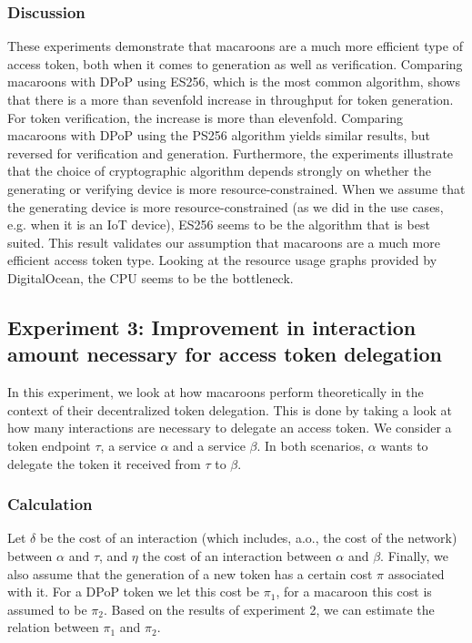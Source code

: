 \subsubsection{Discussion}
These experiments demonstrate that macaroons are a much more efficient type of access token, both when it comes to generation as well as verification. Comparing macaroons with \gls{DPoP} using ES256, which is the most common algorithm, shows that there is a more than sevenfold increase in throughput for token generation. For token verification, the increase is more than elevenfold. Comparing macaroons with \gls{DPoP} using the PS256 algorithm yields similar results, but reversed for verification and generation. Furthermore, the experiments illustrate that the choice of cryptographic algorithm depends strongly on whether the generating or verifying device is more resource-constrained. When we assume that the generating device is more resource-constrained (as we did in the use cases, e.g. when it is an IoT device), ES256 seems to be the algorithm that is best suited.  This result validates our assumption that macaroons are a much more efficient access token type. Looking at the resource usage graphs provided by DigitalOcean, the CPU seems to be the bottleneck.

\subsection{Experiment 3: Improvement in interaction amount necessary for access token delegation}
\label{sec:interactions-access-token-delegation}
In this experiment, we look at how macaroons perform theoretically in the context of their decentralized token delegation. This is done by taking a look at how many interactions are necessary to delegate an access token. We consider a token endpoint $\tau$, a service $\alpha$ and a service $\beta$. In both scenarios, $\alpha$ wants to delegate the token it received from $\tau$ to $\beta$.

\subsubsection{Calculation}
Let $\delta$ be the cost of an interaction (which includes, a.o., the cost of the network) between $\alpha$ and $\tau$, and $\eta$ the cost of an interaction between $\alpha$ and $\beta$. Finally, we also assume that the generation of a new token has a certain cost $\pi$ associated with it. For a \gls{DPoP} token we let this cost be $\pi_1$, for a macaroon this cost is assumed to be $\pi_2$. Based on the results of experiment 2, we can estimate the relation between $\pi_1$ and $\pi_2$.\\

